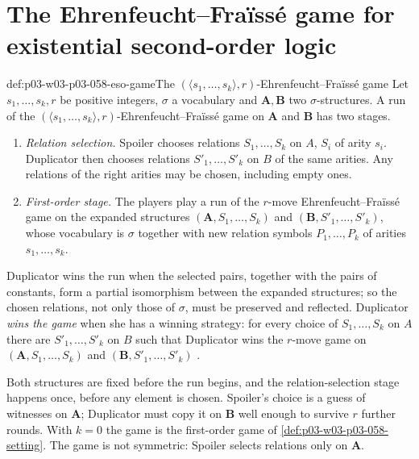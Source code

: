 \section{The Ehrenfeucht--Fra\"iss\'e game for existential second-order logic}
\label{sec:p03-w03-p03-058-eso-game}

\begin{hbdefinition}{def:p03-w03-p03-058-eso-game}{The \((\langle s_1,\ldots,s_k\rangle,r)\)-Ehrenfeucht--Fra\"iss\'e game}
Let \(s_1,\ldots,s_k,r\) be positive integers, \(\sigma\) a vocabulary and
\(\mathbf A,\mathbf B\) two \(\sigma\)-structures. A run of the
\((\langle s_1,\ldots,s_k\rangle,r)\)-Ehrenfeucht--Fra\"iss\'e game on
\(\mathbf A\) and \(\mathbf B\) has two stages.
\begin{enumerate}
\item \emph{Relation selection.} Spoiler chooses relations
      \(S_1,\ldots,S_k\) on \(A\), \(S_i\) of arity \(s_i\). Duplicator then
      chooses relations \(S'_1,\ldots,S'_k\) on \(B\) of the same arities.
      Any relations of the right arities may be chosen, including empty
      ones.
\item \emph{First-order stage.} The players play a run of the \(r\)-move
      Ehrenfeucht--Fra\"iss\'e game on the expanded structures
      \((\mathbf A,S_1,\ldots,S_k)\) and \((\mathbf B,S'_1,\ldots,S'_k)\),
      whose vocabulary is \(\sigma\) together with new relation symbols
      \(P_1,\ldots,P_k\) of arities \(s_1,\ldots,s_k\).
\end{enumerate}
Duplicator wins the run when the selected pairs, together with the pairs of
constants, form a partial isomorphism between the expanded structures; so
the chosen relations, not only those of \(\sigma\), must be preserved and
reflected. Duplicator \emph{wins the game} when she has a winning strategy:
for every choice of \(S_1,\ldots,S_k\) on \(A\) there are
\(S'_1,\ldots,S'_k\) on \(B\) such that Duplicator wins the \(r\)-move
game on \((\mathbf A,S_1,\ldots,S_k)\) and \((\mathbf B,S'_1,\ldots,S'_k)\)
\cite[Def.~5.1, p.~26]{Kolaitis2003ExpressivePowerNotes}.
\end{hbdefinition}

Both structures are fixed before the run begins, and the relation-selection
stage happens once, before any element is chosen. Spoiler's choice is a
guess of witnesses on \(\mathbf A\); Duplicator must copy it on
\(\mathbf B\) well enough to survive \(r\) further rounds. With \(k=0\) the
game is the first-order game of \cref{def:p03-w03-p03-058-setting}. The game
is not symmetric: Spoiler selects relations only on \(\mathbf A\).

